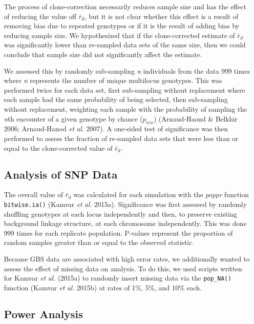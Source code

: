 \documentclass[]{article}
\theoremstyle{definition}
\theoremstyle{definition}
\theoremstyle{definition}
\theoremstyle{remark}
\begin{document}
The process of clone-correction necessarily reduces sample size and has
the effect of reducing the value off \(\bar{r}_d\), but it is not clear
whether this effect is a result of removing bias due to repeated
genotypes or if it is the result of adding bias by reducing sample size.
We hypothesized that if the clone-corrected estimate of \(\bar{r}_d\)
was significantly lower than re-sampled data sets of the same size, then
we could conclude that sample size did not significantly affect the
estimate.

We assessed this by randomly sub-sampling \emph{n} individuals from the
data 999 times where \emph{n} represents the number of unique multilocus
genotypes. This was performed twice for each data set, first
sub-sampling without replacement where each sample had the same
probability of being selected, then sub-sampling without replacement,
weighting each sample with the probability of sampling the \emph{n}th
encounter of a given genotype by chance (\(p_{sex}\)) (Arnaud-Haond \&
Belkhir 2006; Arnaud-Hanod \emph{et al.} 2007). A one-sided test of
significance was then performed to assess the fraction of re-sampled
data sets that were less than or equal to the clone-corrected value of
\(\bar{r}_d\).

\subsection{Analysis of SNP Data}\label{analysis-of-snp-data}

The overall value of \(\bar{r}_d\) was calculated for each simulation
with the \emph{poppr} function \texttt{bitwise.ia()} (Kamvar \emph{et
al.} 2015a). Significance was first assessed by randomly shuffling
genotypes at each locus independently and then, to preserve existing
background linkage structure, at each chromosome independently. This was
done 999 times for each replicate population. P-values represent the
proportion of random samples greater than or equal to the observed
statistic.

Because GBS data are associated with high error rates, we additionally
wanted to assess the effect of missing data on analysis. To do this, we
used scripts written for Kamvar \emph{et al.} (2015a) to randomly insert
missing data via the \texttt{pop\_NA()} function (Kamvar \emph{et al.}
2015b) at rates of 1\%, 5\%, and 10\% each.

\subsection{Power Analysis}\label{power-analysis}
\end{document}
